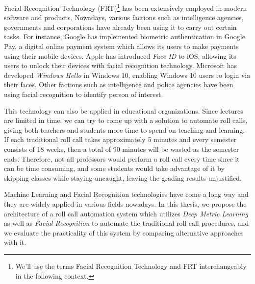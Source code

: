 Facial Recognition Technology (FRT)\footnote{We'll use the terms Facial Recognition Technology and FRT interchangeably in the following context.}
has been extensively employed in modern software and products. Nowadays, various factions such as intelligence agencies, governments
and corporations have already been using it to carry out certain tasks. For instance, Google has implemented biometric authentication
in Google Pay, a digital online payment system which allows its users to make payments using their mobile devices.
Apple has introduced \emph{Face ID} to iOS, allowing its users to unlock their devices with facial recognition technology.
Microsoft has developed \emph{Windows Hello} in Windows 10, enabling Windows 10 users to login via their faces.
Other factions such as intelligence and police agencies have been using facial recognition to identify person of interest.

This technology can also be applied in educational organizations. Since lectures are limited in time, we can try to come up
with a solution to automate roll calls, giving both teachers and students more time to spend on teaching and learning.
If each traditional roll call takes approximately 5 minutes and every semester consists of 18 weeks, then a total of 90 minutes
will be wasted as the semester ends. Therefore, not all professors would perform a roll call every time since it can be time consuming,
and some students would take advantage of it by skipping classes while staying uncaught, leaving the grading results unjustified.

Machine Learning and Facial Recognition technologies have come a long way and they are widely applied in various fields nowadays.
In this thesis, we propose the architecture of a roll call automation system which utilizes \emph{Deep Metric Learning} as well as
\emph{Facial Recognition} to automate the traditional roll call procedures, and we evaluate the practicality of this system 
by comparing alternative approaches with it.




